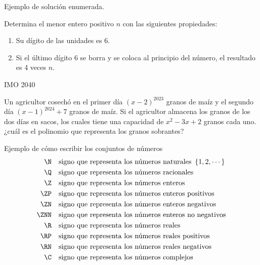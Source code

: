 \begin{solution}[1]
    Ejemplo de solución enumerada.
\end{solution}

\begin{problem}
    Determina el menor entero positivo $n$ con las siguientes propiedades:
    \begin{enumerate}
        \item Su dígito de las unidades es 6.
        \item Si el último dígito 6 se borra y se coloca al principio del número, el resultado es 4 veces $n$.
    \end{enumerate}
    \begin{source-problem}
        IMO 2040
    \end{source-problem}
\end{problem}

\begin{section-problem.tcb}
        Un agricultor cosechó en el primer día $(x - 2)^{2023}$ granos de maíz y el segundo día $(x - 1)^{2024} + 7$ granos de maíz.
        Si el agricultor almacena los granos de los dos días en sacos, los cuales tiene una capacidad de $x^2 - 3x + 2$ granos cada uno.
        ¿cuál es el polinomio que representa los granos sobrantes?
\end{section-problem.tcb}

Ejemplo de cómo escribir los conjuntos de números
\begin{align*}
    \N & \quad \text{signo que representa los números naturales}\ \left\{ 1, 2, \cdots \right\}\\
    \Q & \quad \text{signo que representa los números racionales}\\
    \Z & \quad \text{signo que representa los números enteros}\\
    \ZP &\quad \text{signo que representa los números enteros positivos}\\
    \ZN &\quad \text{signo que representa los números enteros negativos}\\
    \ZNN &\quad \text{signo que representa los números enteros no negativos}\\
    \R &\quad \text{signo que representa los números reales}\\
    \RP &\quad \text{signo que representa los números reales positivos}\\
    \RN &\quad \text{signo que representa los números reales negativos}\\
    \C &\quad \text{signo que representa los números complejos}
\end{align*}


